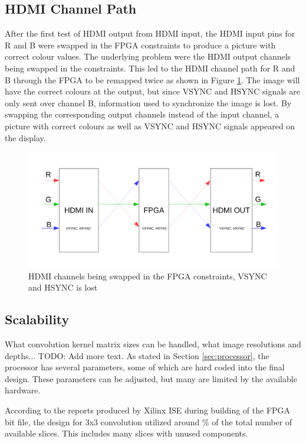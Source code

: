 \subsection{HDMI Channel Path}
After the first test of HDMI output from HDMI input, the HDMI input pins for R and B were swapped in the FPGA constraints to produce a picture with correct colour values.
The underlying problem were the HDMI output channels being swapped in the constraints. 
This led to the HDMI channel path for R and B through the FPGA to be remapped twice as shown in Figure \ref{fig:hdmiChannelPath}.
The image will have the correct colours at the output, but since VSYNC and HSYNC signals are only sent over channel B, information used to synchronize the image is lost.
By swapping the corresponding output channels instead of the input channel, a picture with correct colours as well as VSYNC and HSYNC signals appeared on the display.

\begin{figure}[h!]
    \includegraphics[width=\linewidth]{img/hdmi_channel_path.pdf}
    \caption[HDMI channels being swapped in the FPGA constraints.]{HDMI channels being swapped in the FPGA constraints, VSYNC and HSYNC is lost}
    \label{fig:hdmiChannelPath}
\end{figure}

\subsection{Scalability}
What convolution kernel matrix sizes can be handled, what image resolutions and depths... TODO: Add more text.
As stated in Section \ref{sec:processor}, the processor has several parameters, some of which are hard coded into the final design.
These parameters can be adjusted, but many are limited by the available hardware.

According to the reports produced by Xilinx ISE during building of the FPGA bit file, the design for 3x3 convolution utilized around \unit[16]{\%} of the total number of available slices.
This includes many slices with unused components.

